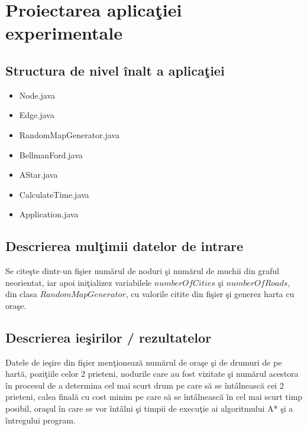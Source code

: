 \documentclass{article}
\begin{document}
\section{Proiectarea aplica\c{t}iei experimentale}
\subsection{Structura de nivel \^{i}nalt a aplica\c{t}iei}
\begin{itemize}
    \item Node.java
    \item Edge.java
    \item RandomMapGenerator.java
    \item BellmanFord.java 
    \item AStar.java
    \item CalculateTime.java
    \item Application.java
\end{itemize}
\subsection{Descrierea mul\c{t}imii datelor de intrare}
Se cite\c{s}te dintr-un fi\c{s}ier num\u{a}rul de noduri \c{s}i num\u{a}rul de muchii din graful neorientat, iar apoi ini\c{t}ializez variabilele $numberOfCities$ \c{s}i $numberOfRoads$, din clasa $RandomMapGenerator$, cu valorile citite din fi\c{s}ier \c{s}i generez harta cu ora\c{s}e.

\subsection{Descrierea ie\c{s}irilor / rezultatelor}
Datele de ie\c{s}ire din fi\c{s}ier men\c{t}ioneaz\u{a} num\u{a}rul de ora\c{s}e \c{s}i de drumuri de pe hart\u{a}, pozi\c{t}iile celor 2 prieteni, nodurile care au fost vizitate \c{s}i num\u{a}rul acestora \^{i}n procesul de a determina cel mai scurt drum pe care s\u{a} se \^{i}nt\^{a}lneasc\u{a} cei 2 prieteni, calea final\u{a} cu cost minim pe care s\u{a} se \^{i}nt\^{a}lneasc\u{a} \^{i}n cel mai scurt timp posibil, ora\c{s}ul \^{i}n care se vor \^{i}nt\^{a}lni \c{s}i timpii de execu\c{t}ie ai algoritmului A* \c{s}i a \^{i}ntregului program.

\newpage
\end{document}
